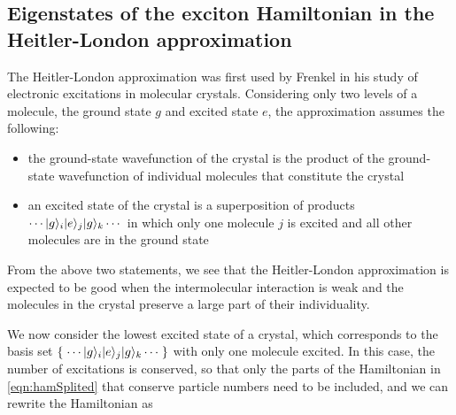 \subsection{Eigenstates of the exciton Hamiltonian in the Heitler-London approximation}
\label{sec:eigenstateExcitonHam}

The Heitler-London approximation was first used by Frenkel  in his study \cite{Frenkel1, Frenkel2} of
 electronic excitations in molecular crystals. Considering only two levels of a molecule, the ground state $g$ and 
excited state $e$, the approximation assumes the following:
\begin{itemize}
\item the ground-state wavefunction of the crystal is the product of the ground-state wavefunction of individual molecules that constitute the crystal
% 
\item an excited state of the crystal is a superposition of products $ \cdots | g \rangle_i | e \rangle_j| g \rangle_k\cdots$ in which
only one molecule $j$ is excited and all other molecules are in the ground state
\end{itemize}
From the above two statements, we see that the  Heitler-London approximation is expected to be good when the 
intermolecular interaction is weak and the molecules in the crystal preserve a large part of their individuality. 

We now consider the lowest excited state of a crystal, which corresponds to the basis set $\{ \; \cdots | g \rangle_i | e \rangle_j| g \rangle_k\cdots \; \}$  with only one molecule excited. In this case, the number of excitations is conserved, so
that only the parts of the Hamiltonian in \autoref{eqn:hamSplited} that conserve particle numbers need to be included, and we can rewrite   the 
Hamiltonian as


